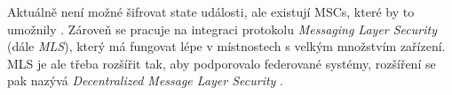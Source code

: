 Aktuálně není možné šifrovat state události, ale existují MSCs, které by to
umožnily \cite{GitHub-MSC3414}. Zároveň se pracuje na integraci protokolu
\textit{Messaging Layer Security} (dále \textit{MLS}), který má fungovat lépe v
místnostech s velkým množstvím zařízení. MLS je ale třeba rozšířit tak, aby
podporovalo federované systémy, rozšíření se pak nazývá \textit{Decentralized
	Message Layer Security} \cite{AreWeMLSYet}.
